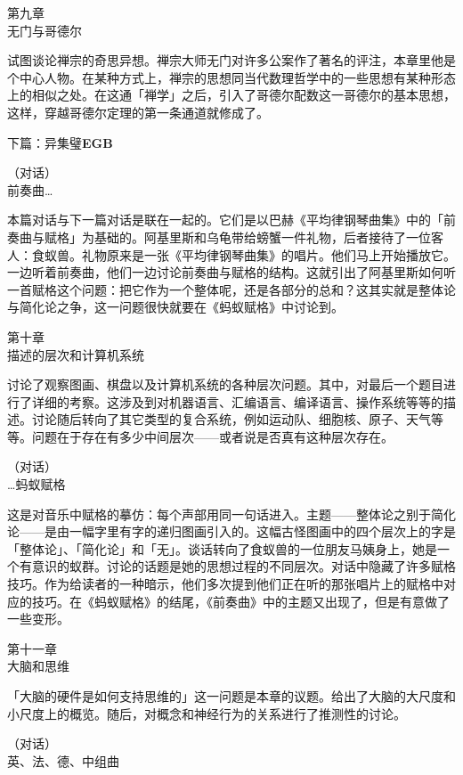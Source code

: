 \documentclass[
  12pt,
  twoside,
  openright,
  oldfontcommands,
]{memoir}
\newcommand{\kaitibold}[1]{{\kaitifamily\bfseries #1}}
\begin{document}
第九章\\
{无门与哥德尔}

试图谈论禅宗的奇思异想。禅宗大师无门对许多公案作了著名的评注，本章里他是个中心人物。在某种方式上，禅宗的思想同当代数理哲学中的一些思想有某种形态上的相似之处。在这通「禅学」之后，引入了哥德尔配数这一哥德尔的基本思想，这样，穿越哥德尔定理的第一条通道就修成了。

\label{Overview_split_001.xhtml}{}

\label{Overview_split_001.xhtml_calibre_pb_0}
下篇：异集璧\kaitibold{EGB}

（对话）\\
{前奏曲\ldots{}}

本篇对话与下一篇对话是联在一起的。它们是以巴赫《平均律钢琴曲集》中的「前奏曲与赋格」为基础的。阿基里斯和乌龟带给螃蟹一件礼物，后者接待了一位客人：食蚁兽。礼物原来是一张《平均律钢琴曲集》的唱片。他们马上开始播放它。一边听着前奏曲，他们一边讨论前奏曲与赋格的结构。这就引出了阿基里斯如何听一首赋格这个问题：把它作为一个整体呢，还是各部分的总和？这其实就是整体论与简化论之争，这一问题很快就要在《蚂蚁赋格》中讨论到。

第十章\\
{描述的层次和计算机系统}

讨论了观察图画、棋盘以及计算机系统的各种层次问题。其中，对最后一个题目进行了详细的考察。这涉及到对机器语言、汇编语言、编译语言、操作系统等等的描述。讨论随后转向了其它类型的复合系统，例如运动队、细胞核、原子、天气等等。问题在于存在有多少中间层次------或者说是否真有这种层次存在。

（对话）\\
{\ldots 蚂蚁赋格}

这是对音乐中赋格的摹仿：每个声部用同一句话进入。主题------整体论之别于简化论------是由一幅字里有字的递归图画引入的。这幅古怪图画中的四个层次上的字是「整体论」、「简化论」和「无」。谈话转向了食蚁兽的一位朋友马姨身上，她是一个有意识的蚁群。讨论的话题是她的思想过程的不同层次。对话中隐藏了许多赋格技巧。作为给读者的一种暗示，他们多次提到他们正在听的那张唱片上的赋格中对应的技巧。在《蚂蚁赋格》的结尾，《前奏曲》中的主题又出现了，但是有意做了一些变形。

第十一章\\
{大脑和思维}

「大脑的硬件是如何支持思维的」这一问题是本章的议题。给出了大脑的大尺度和小尺度上的概览。随后，对概念和神经行为的关系进行了推测性的讨论。

（对话）\\
{英、法、德、中组曲}
\end{document}
